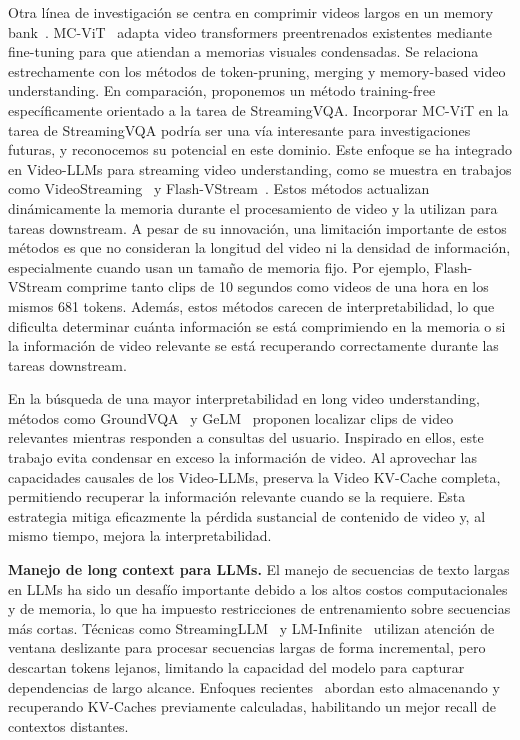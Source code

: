 Otra línea de investigación se centra en comprimir videos largos en un memory bank~\citep{wu2019long, wu2022memvit, wang2023memory}.
MC-ViT~\citep{mc_vit} adapta video transformers preentrenados existentes mediante fine-tuning para que atiendan a memorias visuales condensadas. Se relaciona estrechamente con los métodos de token-pruning, merging y memory-based video understanding. En comparación, proponemos un método training-free específicamente orientado a la tarea de StreamingVQA. Incorporar MC-ViT en la tarea de StreamingVQA podría ser una vía interesante para investigaciones futuras, y reconocemos su potencial en este dominio.
Este enfoque se ha integrado en Video-LLMs para streaming video understanding, como se muestra en trabajos como VideoStreaming~\citep{videostreaming} y Flash-VStream~\citep{flashvstream}. Estos métodos actualizan dinámicamente la memoria durante el procesamiento de video y la utilizan para tareas downstream.
A pesar de su innovación, una limitación importante de estos métodos es que no consideran la longitud del video ni la densidad de información, especialmente cuando usan un tamaño de memoria fijo. Por ejemplo, Flash-VStream comprime tanto clips de 10 segundos como videos de una hora en los mismos 681 tokens.
Además, estos métodos carecen de interpretabilidad, lo que dificulta determinar cuánta información se está comprimiendo en la memoria o si la información de video relevante se está recuperando correctamente durante las tareas downstream.

En la búsqueda de una mayor interpretabilidad en long video understanding, métodos como GroundVQA~\citep{di2023groundvqa} y GeLM~\citep{chen2024groundedmultihopvideoqalongform} proponen localizar clips de video relevantes mientras responden a consultas del usuario. Inspirado en ellos, este trabajo evita condensar en exceso la información de video. Al aprovechar las capacidades causales de los Video-LLMs, preserva la Video KV-Cache completa, permitiendo recuperar la información relevante cuando se la requiere. Esta estrategia mitiga eficazmente la pérdida sustancial de contenido de video y, al mismo tiempo, mejora la interpretabilidad.

\noindent\textbf{Manejo de long context para LLMs.} 
El manejo de secuencias de texto largas en LLMs ha sido un desafío importante debido a los altos costos computacionales y de memoria, lo que ha impuesto restricciones de entrenamiento sobre secuencias más cortas.
Técnicas como StreamingLLM~\citep{streamingllm} y LM-Infinite~\citep{lm_infinite} utilizan atención de ventana deslizante para procesar secuencias largas de forma incremental, pero descartan tokens lejanos, limitando la capacidad del modelo para capturar dependencias de largo alcance. Enfoques recientes~\citep{infllm,quickllama,em_llm} abordan esto almacenando y recuperando KV-Caches previamente calculadas, habilitando un mejor recall de contextos distantes.

